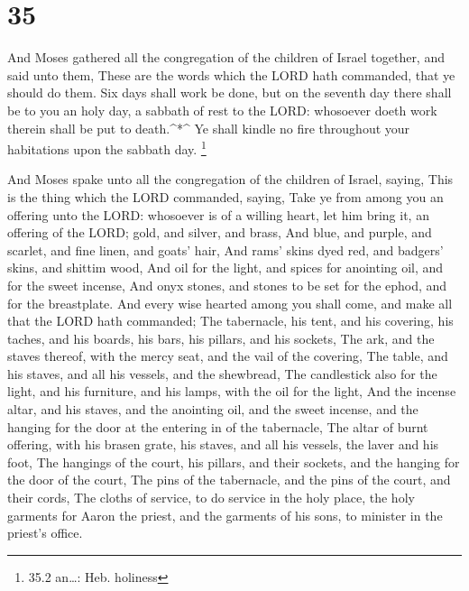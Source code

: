 \hypertarget{section-34}{%
\section{35}\label{section-34}}

 And Moses gathered all the congregation of the children of
Israel together, and said unto them, These are the words which the LORD
hath commanded, that ye should do them.  Six days shall work
be done, but on the seventh day there shall be to you an holy day, a
sabbath of rest to the LORD: whosoever doeth work therein shall be put
to death.\^{}*\^{}  Ye shall kindle no fire throughout your
habitations upon the sabbath day. \footnote{35.2 an\ldots: Heb. holiness}

 And Moses spake unto all the congregation of the children
of Israel, saying, This is the thing which the LORD commanded, saying,
 Take ye from among you an offering unto the LORD: whosoever
is of a willing heart, let him bring it, an offering of the LORD; gold,
and silver, and brass,  And blue, and purple, and scarlet,
and fine linen, and goats' hair,  And rams' skins dyed red,
and badgers' skins, and shittim wood,  And oil for the
light, and spices for anointing oil, and for the sweet incense,
 And onyx stones, and stones to be set for the ephod, and
for the breastplate.  And every wise hearted among you
shall come, and make all that the LORD hath commanded;  The
tabernacle, his tent, and his covering, his taches, and his boards, his
bars, his pillars, and his sockets,  The ark, and the
staves thereof, with the mercy seat, and the vail of the covering,
 The table, and his staves, and all his vessels, and the
shewbread,  The candlestick also for the light, and his
furniture, and his lamps, with the oil for the light,  And
the incense altar, and his staves, and the anointing oil, and the sweet
incense, and the hanging for the door at the entering in of the
tabernacle,  The altar of burnt offering, with his brasen
grate, his staves, and all his vessels, the laver and his foot,
 The hangings of the court, his pillars, and their sockets,
and the hanging for the door of the court,  The pins of the
tabernacle, and the pins of the court, and their cords, 
The cloths of service, to do service in the holy place, the holy
garments for Aaron the priest, and the garments of his sons, to minister
in the priest's office.

